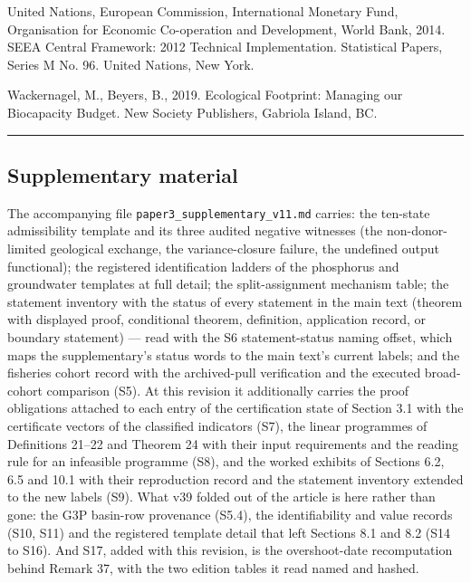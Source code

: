 \documentclass[11pt]{article}
\begin{document}
United Nations, European Commission, International Monetary Fund, Organisation for Economic Co-operation and Development, World Bank, 2014. SEEA Central Framework: 2012 Technical Implementation. Statistical Papers, Series M No. 96. United Nations, New York.

Wackernagel, M., Beyers, B., 2019. Ecological Footprint: Managing our
Biocapacity Budget. New Society Publishers, Gabriola Island, BC.

\begin{center}\rule{0.5\linewidth}{0.5pt}\end{center}

\subsection{Supplementary material}\label{supplementary-material}

The accompanying file \texttt{paper3\_supplementary\_v11.md} carries: the
ten-state admissibility template and its three audited negative
witnesses (the non-donor-limited geological exchange, the
variance-closure failure, the undefined output functional); the
registered identification ladders of the phosphorus and groundwater
templates at full detail; the split-assignment mechanism table; the
statement inventory with the status of every statement in the main text
(theorem with displayed proof, conditional theorem, definition,
application record, or boundary statement) --- read with the S6
statement-status naming offset, which maps the supplementary's status
words to the main text's current labels; and the fisheries cohort record
with the archived-pull verification and the executed broad-cohort
comparison (S5). At this revision it additionally carries the proof obligations attached to each entry of the certification state of Section 3.1 with the certificate vectors of the classified indicators (S7), the linear programmes of Definitions 21--22 and Theorem 24 with their input requirements and the reading rule for an infeasible programme (S8), and the worked exhibits of Sections 6.2, 6.5 and 10.1 with their reproduction record and the statement
inventory extended to the new labels (S9). What v39 folded out of the article is here rather than gone: the
G3P basin-row provenance (S5.4), the identifiability and value records (S10, S11) and the registered
template detail that left Sections 8.1 and 8.2 (S14 to S16). And S17, added with this revision, is the
overshoot-date recomputation behind Remark 37, with the two edition tables it read named and hashed.
\end{document}

